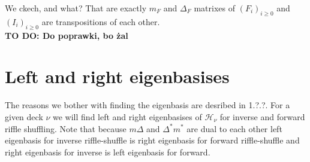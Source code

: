 \documentclass[a4paper, 12pt]{report}
\newcommand{\todo}[1]{\hfill \break \textbf{\Huge TO DO: #1 \hfill \break}\normalsize}
\begin{document}
We ckech, and what? That are exactly $m_F$ and $\Delta_F$ matrixes of $(F_i)_{i \geq 0}$ and $(I_i)_{i
\geq 0}$
are transpositions of each other.\\
\todo{Do poprawki, bo żal}


\chapter{Left and right eigenbasises}

The reasons we bother with finding the eigenbasis are desribed in 1.?.?. For a given deck $\nu$
we will find left and right eigenbasises of $\mathcal{H}_\nu$ for inverse and forward riffle shuffling.
Note that because
$m\Delta$ and $\Delta^*m^*$ are dual to each other left eigenbasis for inverse riffle-shuffle is right
eigenbasis for forward riffle-shuffle and right eigenbasis for inverse is left eigenbasis for forward.
\end{document}
